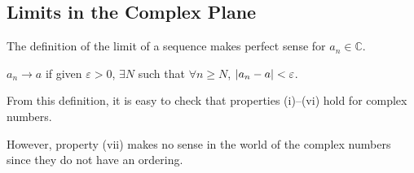 \subsection{Limits in the Complex Plane}
\begin{remark}
	The definition of the limit of a sequence makes perfect sense for \(a_n \in \mathbb C\).
\end{remark}
\begin{definition}
	\(a_n \to a\) if given \(\varepsilon > 0\), \(\exists N\) such that \(\forall n \geq N\), \(\abs{a_n - a} < \varepsilon\).
\end{definition}
From this definition, it is easy to check that properties (i)--(vi) hold for complex numbers.

However, property (vii) makes no sense in the world of the complex numbers since they do not have an ordering.
